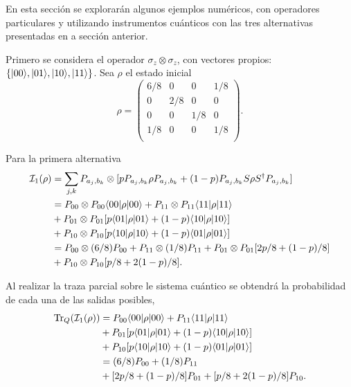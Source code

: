 En esta sección se explorarán algunos ejemplos numéricos, con operadores particulares y utilizando instrumentos cuánticos con las tres alternativas presentadas en a sección anterior.

Primero se considera el operador $\sigma_z \otimes \sigma_z$, con vectores propios: $\{|00\rangle, |01\rangle, |10\rangle, |11\rangle\}$. Sea $\rho $ el estado inicial
\[\rho={\begin{pmatrix}6/8&0&0 &1/8\\0&2/8&0 &0\\0 &0 &1/8 &0 \\1/8&0&0&1/8\\\end{pmatrix}}.\]

Para la primera alternativa 
\begin{equation}\label{primer_alternativa_ejemplo}
    \begin{split}
        \mathcal{I}_1(\rho)&=\sum_{j,k}P_{a_j,b_k}\otimes[p P_{a_j,b_k}\rho P_{a_j,b_k}+(1-p)P_{a_j,b_k}S\rho S^\dagger P_{a_j,b_k}]\\
        &=P_{00}\otimes P_{00} \langle 00|\rho|00\rangle + P_{11}\otimes P_{11} \langle 11|\rho|11\rangle\\
        &+P_{01} \otimes P_{01}[p \langle 01|\rho|01\rangle+(1-p)\langle 10|\rho|10\rangle]\\
        &+P_{10} \otimes P_{10}[p \langle 10|\rho|10\rangle+(1-p)\langle 01|\rho|01\rangle]\\
        &=P_{00}\otimes (6/8)P_{00} + P_{11}\otimes (1/8)P_{11}+P_{01} \otimes P_{01}[2p/8 +(1-p)/8]\\
        &+P_{10} \otimes P_{10}[p/8+2(1-p)/8].\\
    \end{split}
\end{equation}


Al realizar la traza parcial sobre le sistema cuántico se obtendrá la probabilidad de cada una de las salidas posibles, \begin{equation}\label{traza_S1_ejemplo1}
    \begin{split}
        {\rm Tr}_Q(\mathcal{I}_1(\rho)) &= P_{00} \langle 00|\rho|00\rangle + P_{11} \langle 11|\rho|11\rangle\\
        &+P_{01}[p \langle 01|\rho|01\rangle+(1-p)\langle 10|\rho|10\rangle]\\
        &+P_{10}[p \langle 10|\rho|10\rangle+(1-p)\langle 01|\rho|01\rangle]\\
        &=(6/8)P_{00} + (1/8)P_{11}\\
        &+[2p/8 +(1-p)/8]P_{01}+ [p/8+2(1-p)/8]P_{10}.\\
    \end{split}
\end{equation}

